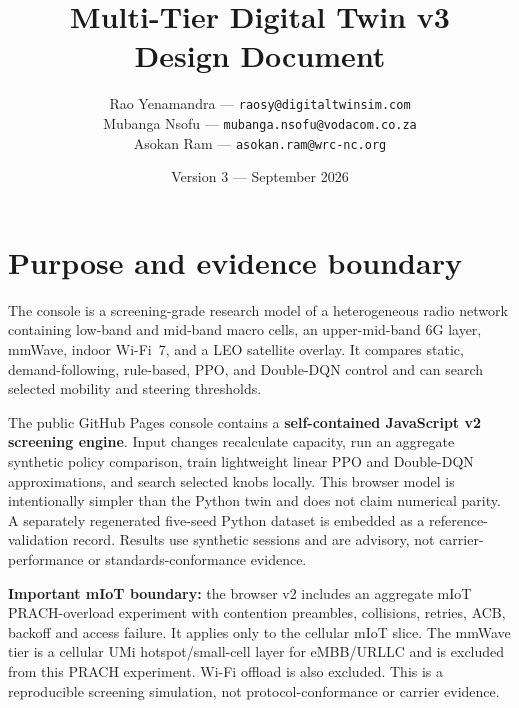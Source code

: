 \documentclass[10pt]{article}
\title{Multi-Tier Digital Twin v3\\Design Document}
\author{Rao Yenamandra --- \texttt{raosy@digitaltwinsim.com}\\
Mubanga Nsofu --- \texttt{mubanga.nsofu@vodacom.co.za}\\
Asokan Ram --- \texttt{asokan.ram@wrc-nc.org}}
\date{Version 3 --- September 2026}
\begin{document}
\maketitle

\section{Purpose and evidence boundary}
The console is a screening-grade research model of a heterogeneous radio network containing low-band and mid-band macro cells, an upper-mid-band 6G layer, mmWave, indoor Wi-Fi~7, and a LEO satellite overlay. It compares static, demand-following, rule-based, PPO, and Double-DQN control and can search selected mobility and steering thresholds.

The public GitHub Pages console contains a \textbf{self-contained JavaScript v2 screening engine}. Input changes recalculate capacity, run an aggregate synthetic policy comparison, train lightweight linear PPO and Double-DQN approximations, and search selected knobs locally. This browser model is intentionally simpler than the Python twin and does not claim numerical parity. A separately regenerated five-seed Python dataset is embedded as a reference-validation record. Results use synthetic sessions and are advisory, not carrier-performance or standards-conformance evidence.

\textbf{Important mIoT boundary:} the browser v2 includes an aggregate mIoT PRACH-overload experiment with contention preambles, collisions, retries, ACB, backoff and access failure. It applies only to the cellular mIoT slice. The mmWave tier is a cellular UMi hotspot/small-cell layer for eMBB/URLLC and is excluded from this PRACH experiment. Wi-Fi offload is also excluded. This is a reproducible screening simulation, not protocol-conformance or carrier evidence.
\end{document}
